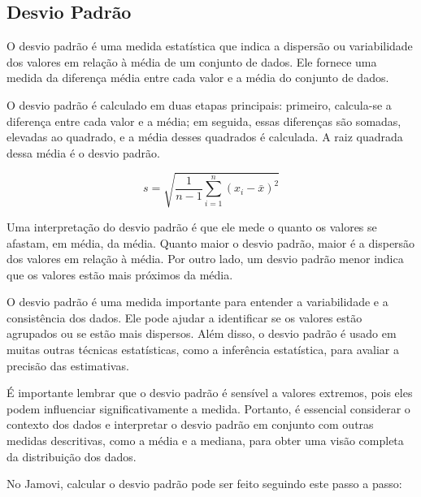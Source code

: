 \subsection{Desvio Padrão}

O desvio padrão é uma medida estatística que indica a dispersão ou variabilidade dos valores em relação à média de um conjunto de dados. Ele fornece uma medida da diferença média entre cada valor e a média do conjunto de dados.

O desvio padrão é calculado em duas etapas principais: primeiro, calcula-se a diferença entre cada valor e a média; em seguida, essas diferenças são somadas, elevadas ao quadrado, e a média desses quadrados é calculada. A raiz quadrada dessa média é o desvio padrão.

\[
s = \sqrt{\frac{1}{n-1} \sum_{i=1}^{n} (x_i - \bar{x})^2}
\]

Uma interpretação do desvio padrão é que ele mede o quanto os valores se afastam, em média, da média. Quanto maior o desvio padrão, maior é a dispersão dos valores em relação à média. Por outro lado, um desvio padrão menor indica que os valores estão mais próximos da média.

O desvio padrão é uma medida importante para entender a variabilidade e a consistência dos dados. Ele pode ajudar a identificar se os valores estão agrupados ou se estão mais dispersos. Além disso, o desvio padrão é usado em muitas outras técnicas estatísticas, como a inferência estatística, para avaliar a precisão das estimativas.

É importante lembrar que o desvio padrão é sensível a valores extremos, pois eles podem influenciar significativamente a medida. Portanto, é essencial considerar o contexto dos dados e interpretar o desvio padrão em conjunto com outras medidas descritivas, como a média e a mediana, para obter uma visão completa da distribuição dos dados.

No Jamovi, calcular o desvio padrão pode ser feito seguindo este passo a passo:


